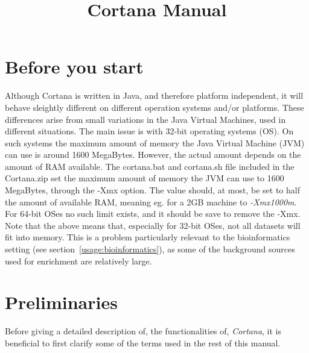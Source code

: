 \documentclass{article}
\begin{document}
\title{Cortana Manual}

\maketitle


\section{Before you start}
\label{section:before}
Although Cortana is written in Java, and therefore platform independent, it will behave sleightly different on different operation systems and/or platforms.
These differences arise from small variations in the Java Virtual Machines, used in different situations.
The main issue is with 32-bit operating systems (OS).
On such systems the maximum amount of memory the Java Virtual Machine (JVM) can use is around 1600 MegaBytes.
However, the actual amount depends on the amount of RAM available.
The cortana.bat and cortana.sh file included in the Cortana.zip set the maximum amount of memory the JVM can use to 1600 MegaBytes, through the -Xmx option.
The value should, at most, be set to half the amount of available RAM, meaning eg. for a 2GB machine to \emph{-Xmx1000m}.
For 64-bit OSes no such limit exists, and it should be save to remove the -Xmx.
Note that the above means that, especially for 32-bit OSes, not all datasets will fit into memory.
This is a problem particularly relevant to the bioinformatics setting (see section~\ref{usage:bioinformatics}), as some of the background sources used for enrichment are relatively large.





\section{Preliminaries}
\label{section:preliminaries}
Before giving a detailed description of, the functionalities of, \emph{Cortana}, it is beneficial to first clarify some of the terms used in the rest of this manual.
\end{document}
